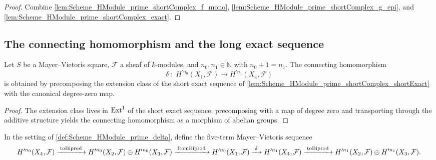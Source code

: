 \begin{proof}
  
  \leanok
  Combine \cref{lem:Scheme_HModule_prime_shortComplex_f_mono}, \cref{lem:Scheme_HModule_prime_shortComplex_g_epi}, and \cref{lem:Scheme_HModule_prime_shortComplex_exact}.
\end{proof}

\subsection{The connecting homomorphism and the long exact sequence}

\begin{definition}\leanok
  \label{def:Scheme_HModule_prime_delta}

  Let \(S\) be a Mayer--Vietoris square, \(\mathcal F\) a sheaf of \(k\)-modules, and \(n_0, n_1 \in \mathbb N\) with \(n_0 + 1 = n_1\). The connecting homomorphism
  \[
    \delta \;:\; H^{\prime n_0}(X_1, \mathcal F) \longrightarrow H^{\prime n_1}(X_4, \mathcal F)
  \]
  is obtained by precomposing the extension class of the short exact sequence of \cref{lem:Scheme_HModule_prime_shortComplex_shortExact} with the canonical degree-zero map.
\end{definition}

\begin{proof}
  
  \leanok
  The extension class lives in \(\operatorname{Ext}^1\) of the short exact sequence; precomposing with a map of degree zero and transporting through the additive structure yields the connecting homomorphism as a morphism of abelian groups.
\end{proof}

\begin{definition}\leanok
  \label{def:Scheme_HModule_prime_sequence}

  In the setting of \cref{def:Scheme_HModule_prime_delta}, define the five-term Mayer--Vietoris sequence
  \[
    H^{\prime n_0}(X_4, \mathcal F) \xrightarrow{\;\operatorname{toBiprod}\;} H^{\prime n_0}(X_2, \mathcal F) \oplus H^{\prime n_0}(X_3, \mathcal F) \xrightarrow{\;\operatorname{fromBiprod}\;} H^{\prime n_0}(X_1, \mathcal F) \xrightarrow{\;\delta\;} H^{\prime n_1}(X_4, \mathcal F) \xrightarrow{\;\operatorname{toBiprod}\;} H^{\prime n_1}(X_2, \mathcal F) \oplus H^{\prime n_1}(X_3, \mathcal F).
  \]
\end{definition}

